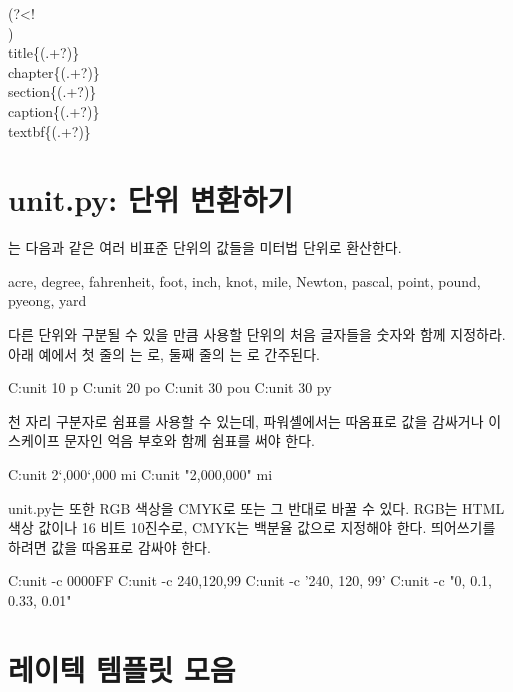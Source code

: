 \begin{codewrite}
(?<!\\)%
\\title\{(.+?)\}	\1
\\chapter\{(.+?)\}	\1
\\section\{(.+?)\}	\1
\\caption\{(.+?)\}	\1
\\textbf\{(.+?)\}	\1
\end{codewrite}
\coderead[language=text]

\section{unit.py: 단위 변환하기}

는 다음과 같은 여러 비표준 단위의 값들을 미터법 단위로 환산한다.

\begin{codewrite}
acre, degree, fahrenheit, foot, inch, knot, mile, Newton, pascal, point, pound, pyeong, yard
\end{codewrite}
\coderead[language=text]

다른 단위와 구분될 수 있을 만큼 사용할 단위의 처음 글자들을 숫자와 함께 지정하라.
아래 예에서 첫 줄의 는 로, 둘째 줄의 는 로 간주된다.

\begin{code}
C:\>unit 10 p 
C:\>unit 20 po
C:\>unit 30 pou
C:\>unit 30 py
\end{code}

천 자리 구분자로 쉼표를 사용할 수 있는데, 파워셸에서는 따옴표로 값을 감싸거나 이스케이프 문자인 억음 부호와 함께 쉼표를 써야 한다.

\begin{code}
C:\>unit 2`,000`,000 mi
C:\>unit "2,000,000" mi
\end{code}

unit.py는 또한 RGB 색상을 CMYK로 또는 그 반대로 바꿀 수 있다.
RGB는 HTML 색상 값이나 16 비트 10진수로, CMYK는 백분율 값으로 지정해야 한다.
띄어쓰기를 하려면 값을 따옴표로 감싸야 한다.

\begin{code}
C:\>unit -c 0000FF
C:\>unit -c 240,120,99
C:\>unit -c '240, 120, 99'
C:\>unit -c "0, 0.1, 0.33, 0.01"
\end{code}

\section{레이텍 템플릿 모음}
\label{sec:mytex}

